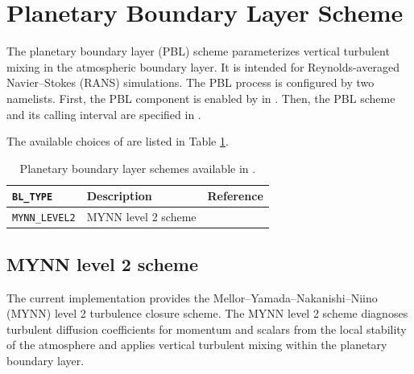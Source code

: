 
\section{Planetary Boundary Layer Scheme} \label{sec:basic_usel_pbl}
The planetary boundary layer (PBL) scheme parameterizes vertical turbulent mixing in the atmospheric boundary layer.
It is intended for Reynolds-averaged Navier--Stokes (RANS) simulations.
The PBL process is configured by two namelists.
First, the PBL component is enabled by
 in .
Then, the PBL scheme and its calling interval are specified in .


The available choices of  are listed in Table \ref{tab:bl_scheme_list}.

\begin{table}[htbp]
\caption{Planetary boundary layer schemes available in \scaledg.}
\label{tab:bl_scheme_list}
\begin{center}
\begin{tabularx}{150mm}{lXX}
\hline
\rowcolor[gray]{0.9}
\verb|BL_TYPE| & Description & Reference \\
\hline
\verb|MYNN_LEVEL2|  & MYNN level 2 scheme & \cite{Nakanishi2006} \\
\hline
\end{tabularx}
\end{center}
\end{table}

\subsection{MYNN level 2 scheme}
\label{subsec:physics_bl_mynn}
The current implementation provides the Mellor--Yamada--Nakanishi--Niino (MYNN) level 2 turbulence closure scheme\cite{Nakanishi2006}.
The MYNN level 2 scheme diagnoses turbulent diffusion coefficients for momentum and scalars from the local stability of the atmosphere and applies vertical turbulent mixing within the planetary boundary layer.